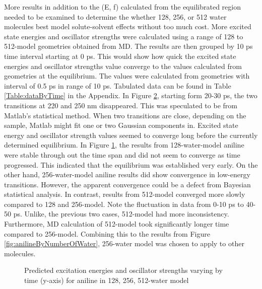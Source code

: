 \documentclass[
journal=jpcbfk, %
manuscript=article]{achemso}
\begin{document}
	More results in addition to the (E, f) calculated from the equilibrated region needed to be examined to determine the whether 128, 256, or 512 water molecules best model solute-solvent effects without too much cost. More excited state energies and oscillator strengths were calculated using a range of 128 to 512-model geometries obtained from MD. The results are then grouped by 10 ps time interval starting at 0 ps. This would show how quick the excited state energies and oscillator strengths value converge to the values calculated from geometries at the equilibrium. The values were calculated from geometries with interval of  0.5 ps in range of 10 ps. Tabulated data can be found in Table \ref{Table:dataByTime} in the Appendix. In Figure \ref{fig:aniline256ByTime}, starting form 20-30 ps, the two transitions at 220 and 250 nm disappeared. This was speculated to be from Matlab's statistical method. When two transitions are close, depending on the sample, Matlab might fit one or two Gaussian components in. Excited state energy and oscillator strength values seemed to converge long before the currently determined equilibrium. In Figure \ref{fig:aniline128ByTime}, the results from 128-water-model aniline were stable through out the time span and did not seem to converge as time progressed. This indicated that the equilibrium was established very early. On the other hand, 256-water-model aniline results did show convergence in low-energy transitions. However, the apparent convergence could be a defect from Bayesian statistical analysis. In contrast, results from 512-model converged more slowly compared to 128 and 256-model. Note the fluctuation in data from 0-10 ps to 40-50 ps. Unlike, the previous two cases, 512-model had more inconsistency. Furthermore, MD calculation of 512-model took significantly longer time compared to 256-model. Combining this to the results from Figure \ref{fig:anilineByNumberOfWater}, 256-water model was chosen to apply to other molecules. 
			
	\begin{figure}[htb]
		\centering
		\begin{subfigure}[b]{0.48\textwidth}
			\caption{}
			\label{fig:aniline128ByTime}
		\end{subfigure}
		\begin{subfigure}[b]{0.48\textwidth}
			\caption{}
			\label{fig:aniline256ByTime}
		\end{subfigure}
		\begin{subfigure}[b]{0.48\textwidth}
			\caption{}
			\label{fig:aniline512ByTime}
		\end{subfigure}
		\caption{Predicted excitation energies and oscillator strengths varying by time (y-axis) for aniline in 128, 256, 512-water model}\label{fig:anilineTDDFTByTime}
	\end{figure}
	
\end{document}
